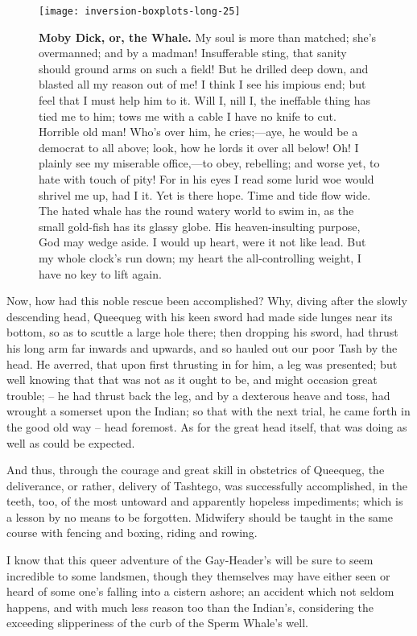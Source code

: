 \documentclass{article}
\begin{document}
\begin{figure}[!htp]
  \begin{center}
      \texttt{[image: inversion-boxplots-long-25]}
    \caption{
        \textbf{Moby Dick, or, the Whale.}
My soul is more than matched; she's overmanned; and by a madman! Insufferable sting, that sanity should ground arms on such a field! But he drilled deep down, and blasted all my reason out of me! I think I see his impious end; but feel that I must help him to it. Will I, nill I, the ineffable thing has tied me to him; tows me with a cable I have no knife to cut. Horrible old man! Who's over him, he cries;—aye, he would be a democrat to all above; look, how he lords it over all below! Oh! I plainly see my miserable office,—to obey, rebelling; and worse yet, to hate with touch of pity! For in his eyes I read some lurid woe would shrivel me up, had I it. Yet is there hope. Time and tide flow wide. The hated whale has the round watery world to swim in, as the small gold-fish has its glassy globe. His heaven-insulting purpose, God may wedge aside. I would up heart, were it not like lead. But my whole clock's run down; my heart the all-controlling weight, I have no key to lift again. 
    }
  \end{center}
\end{figure}

Now, how had this noble rescue been accomplished? Why, diving after the slowly descending head, Queequeg with his keen sword had made side lunges near its bottom, so as to scuttle a large hole there; then dropping his sword, had thrust his long arm far inwards and upwards, and so hauled out our poor Tash by the head. He averred, that upon first thrusting in for him, a leg was presented; but well knowing that that was not as it ought to be, and might occasion great trouble; -- he had thrust back the leg, and by a dexterous heave and toss, had wrought a somerset upon the Indian; so that with the next trial, he came forth in the good old way -- head foremost. As for the great head itself, that was doing as well as could be expected.

   And thus, through the courage and great skill in obstetrics of Queequeg, the deliverance, or rather, delivery of Tashtego, was successfully accomplished, in the teeth, too, of the most untoward and apparently hopeless impediments; which is a lesson by no means to be forgotten. Midwifery should be taught in the same course with fencing and boxing, riding and rowing.

   I know that this queer adventure of the Gay-Header's will be sure to seem incredible to some landsmen, though they themselves may have either seen or heard of some one's falling into a cistern ashore; an accident which not seldom happens, and with much less reason too than the Indian's, considering the exceeding slipperiness of the curb of the Sperm Whale's well.
\end{document}
